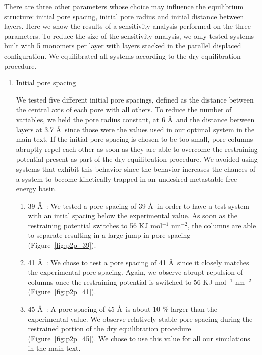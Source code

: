 \documentclass{article}
\begin{document}
  There are three other parameters whose choice may influence the equilibrium
  structure: initial pore spacing, initial pore radius and initial distance
  between layers. Here we show the results of a sensitivity analysis performed
  on the three parameters. To reduce the size of the sensitivity analysis, we
  only tested systems built with 5 monomers per layer with layers stacked in 
  the parallel displaced configuration. We equilibrated all systems according
  to the dry equilibration procedure.


  \begin{enumerate}

	  \item \underline{Initial pore spacing}

	  We tested five different initial pore spacings, defined as the
	  distance between the central axis of each pore with all others. To reduce the
	  number of variables, we held the pore radius constant, at 6 \AA~and the
	  distance between layers at 3.7 \AA~since those were the values used in our
	  optimal system in the main text. If the initial pore spacing is chosen to be
	  too small, pore columns abruptly repel each other as soon as they are able to
	  overcome the restraining potential present as part of the dry equilibration
	  procedure. We avoided using systems that exhibit this behavior since the
	  behavior increases the chances of a system to become kinetically trapped in an
	  undesired metastable free energy basin.  

	  \begin{enumerate}

	  	\item 39 \AA~: We tested a pore spacing of 39 \AA~in order to have a test system
		with an intial spacing below the experimental value. As soon as the restraining
		potential switches to 56 KJ mol$^{-1}$ nm$^{-2}$, the columns are able to
		separate resulting in a large jump in pore spacing (Figure~\ref{fig:p2p_39}). 

		\item 41 \AA~: We chose to test a pore spacing of 41 \AA~since
		it closely matches the experimental pore spacing. Again, we observe abrupt
		repulsion of columns once the restraining potential is switched to 56 KJ
		mol$^{-1}$ nm$^{-2}$ (Figure~\ref{fig:p2p_41}).

		\item 45 \AA~: A pore spacing of 45 \AA~is about 10 \% larger than the
		experimental value. We observe relatively stable pore spacing during the
		restrained portion of the dry equilibration procedure
		(Figure~\ref{fig:p2p_45}). We chose to use this value for all our simulations
		in the main text. 


\end{enumerate}
\end{enumerate}
\end{document}
